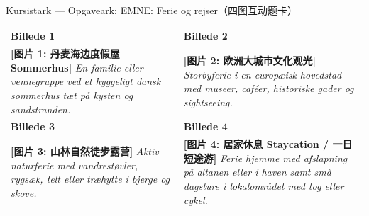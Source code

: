 \begin{emailbox}{Kursistark --- Opgaveark: EMNE: Ferie og rejser（四图互动题卡）}
\small
\renewcommand{\arraystretch}{1.35}
\begin{tabularx}{\linewidth}{@{} >{\raggedright\arraybackslash}X @{\hspace{0.45cm}} >{\raggedright\arraybackslash}X @{}}
\toprule
\textbf{\color{NCDNavy}Billede 1} & \textbf{\color{NCDNavy}Billede 2} \\
\textbf{[图片 1: 丹麦海边度假屋 Sommerhus]}\newline
\textit{En familie eller vennegruppe ved et hyggeligt dansk sommerhus tæt på kysten og sandstranden.} &
\textbf{[图片 2: 欧洲大城市文化观光]}\newline
\textit{Storbyferie i en europæisk hovedstad med museer, caféer, historiske gader og sightseeing.} \\[6pt]
\midrule
\textbf{\color{NCDNavy}Billede 3} & \textbf{\color{NCDNavy}Billede 4} \\
\textbf{[图片 3: 山林自然徒步露营]}\newline
\textit{Aktiv naturferie med vandrestøvler, rygsæk, telt eller træhytte i bjerge og skove.} &
\textbf{[图片 4: 居家休息 Staycation / 一日短途游]}\newline
\textit{Ferie hjemme med afslapning på altanen eller i haven samt små dagsture i lokalområdet med tog eller cykel.} \\
\bottomrule
\end{tabularx}
\end{emailbox}

